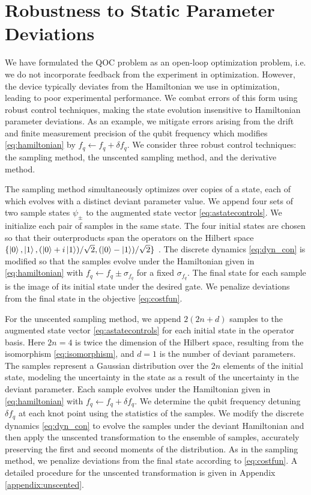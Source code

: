 \section{Robustness to Static Parameter Deviations \label{sec:static}}
We have formulated the QOC
problem as an open-loop optimization problem, i.e.
we do not incorporate feedback from the experiment in optimization.
However, the device typically deviates from the Hamiltonian we use in optimization,
leading to poor experimental performance. We combat errors
of this form using robust control techniques,
making the state evolution insensitive
to Hamiltonian parameter deviations. As an example,
we mitigate errors arising from the drift and finite measurement
precision of the qubit frequency which modifies \eqref{eq:hamiltonian}
by $f_{q} \gets f_{q} + \delta f_{q}$.
We consider three robust control techniques:
the sampling method, the unscented sampling method,
and the derivative method.

The sampling method simultaneously optimizes over copies of a state,
each of which evolves with a distinct deviant parameter value.
We append four sets of two sample states $\psi_{\pm}$
to the augmented state vector \eqref{eq:astatecontrols}.
We initialize each pair of samples in the same state.
The four initial states are chosen so that their outerproducts
span the operators on the Hilbert space
$\{\ket{0}, \ket{1}, (\ket{0} + i\ket{1}) / \sqrt{2},
(\ket{0} - \ket{1}) / \sqrt{2}\}$ \cite{chow2009randomized}.
The discrete dynamics \eqref{eq:dyn_con} is modified so that the
samples evolve under the Hamiltonian given in \eqref{eq:hamiltonian}
with $f_{q} \gets f_{q} \pm \sigma_{f_{q}}$ for a fixed $\sigma_{f_{q}}$.
The final state
for each sample is the image of its initial state
under the desired gate. We penalize deviations
from the final state in the objective \eqref{eq:costfun}.

For the unscented sampling method, we append $2(2n + d)$ samples
to the augmented state vector \eqref{eq:astatecontrols}
for each initial state in the operator basis. Here $2n = 4$ is twice the
dimension of the Hilbert space, resulting from the isomorphism \eqref{eq:isomorphism},
and $d = 1$ is the number of deviant parameters. The samples
represent a Gaussian distribution over the $2n$
elements of the initial state, modeling
the uncertainty in the state as a result of the uncertainty in
the deviant parameter. Each sample evolves under the Hamiltonian
given in \eqref{eq:hamiltonian} with $f_{q} \gets f_{q} + \delta f_{q}$.
We determine the qubit frequency detuning $\delta f_{q}$
at each knot point using the statistics of the samples.
We modify the discrete dynamics \eqref{eq:dyn_con} to
evolve the samples under the deviant Hamiltonian
and then apply the unscented transformation to the ensemble
of samples,
accurately preserving the first and second moments
of the distribution.
As in the sampling method,
we penalize deviations from the final state according to \eqref{eq:costfun}.
A detailed procedure for the unscented transformation is given
in Appendix \ref{appendix:unscented}.

